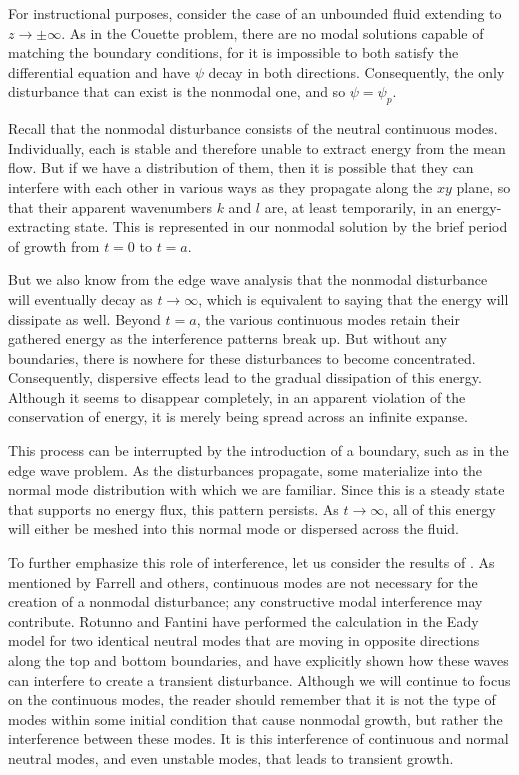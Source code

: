 \documentclass[letterpaper,11pt,onecolumn,twoside,titlepage]{article}
\begin{document}
For instructional purposes, consider the case of an unbounded fluid extending to $z \rightarrow \pm \infty$. As in the Couette problem, there are no modal solutions capable of matching the boundary conditions, for it is impossible to both satisfy the differential equation and have $\psi$ decay in both directions. Consequently, the only disturbance that can exist is the nonmodal one, and so $\psi = \psi_p$.

Recall that the nonmodal disturbance consists of the neutral continuous modes. Individually, each is stable and therefore unable to extract energy from the mean flow. But if we have a distribution of them, then it is possible that they can interfere with each other in various ways as they propagate along the $xy$ plane, so that their apparent wavenumbers $k$ and $l$ are, at least temporarily, in an energy-extracting state. This is represented in our nonmodal solution by the brief period of growth from $t = 0$ to $t = a$.

But we also know from the edge wave analysis that the nonmodal disturbance will eventually decay as $t \rightarrow \infty$, which is equivalent to saying that the energy will dissipate as well. Beyond $t = a$, the various continuous modes retain their gathered energy as the interference patterns break up. But without any boundaries, there is nowhere for these disturbances to become concentrated. Consequently, dispersive effects lead to the gradual dissipation of this energy. Although it seems to disappear completely, in an apparent violation of the conservation of energy, it is merely being spread across an infinite expanse.

This process can be interrupted by the introduction of a boundary, such as in the edge wave problem. As the disturbances propagate, some materialize into the normal mode distribution with which we are familiar. Since this is a steady state that supports no energy flux, this pattern persists. As $t \rightarrow \infty$, all of this energy will either be meshed into this normal mode or dispersed across the fluid.

To further emphasize this role of interference, let us consider the results of \citet{Rotunno+:1989}. As mentioned by Farrell and others, continuous modes are not necessary for the creation of a nonmodal disturbance; any constructive modal interference may contribute. Rotunno and Fantini have performed the calculation in the Eady model for two identical neutral modes that are moving in opposite directions along the top and bottom boundaries, and have explicitly shown how these waves can interfere to create a transient disturbance. Although we will continue to focus on the continuous modes, the reader should remember that it is not the type of modes within some initial condition that cause nonmodal growth, but rather the  interference between these modes. It is this interference of continuous and normal neutral modes, and even unstable modes, that leads to transient growth.
\end{document}
